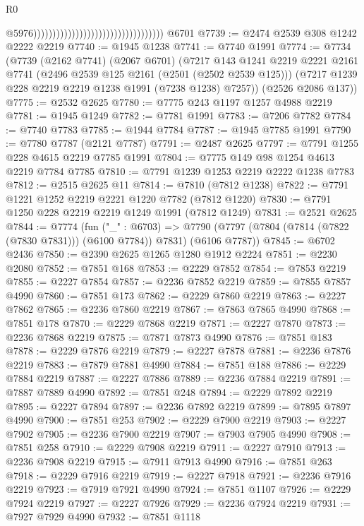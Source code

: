 \begin{lexlean}{R0}
\begin{coremodule}
                                                                        @5976))))))))))))))))))))))))))))))))))
    @6701
@7739 := @2474 @2539 @308 @1242 @2222 @2219
@7740 := @1945 @1238
@7741 := @7740 @1991
@7774 := @7734
    (@7739
      (@2162 @7741)
      (@2067 @6701)
      (@7217
        @143
        @1241
        @2219
        @2221
        @2161
        @7741
        (@2496 @2539 @125 @2161 (@2501 (@2502 @2539 @125)))
        (@7217 @1239 @228 @2219 @2219 @1238 @1991 (@7238 @1238) @7257))
      (@2526 @2086 @137))
@7775 := @2532 @2625
@7780 := @7775 @243 @1197 @1257 @4988 @2219
@7781 := @1945 @1249
@7782 := @7781 @1991
@7783 := @7206 @7782
@7784 := @7740 @7783
@7785 := @1944 @7784
@7787 := @1945 @7785 @1991
@7790 := @7780 @7787 (@2121 @7787)
@7791 := @2487 @2625
@7797 := @7791 @1255 @228 @4615 @2219 @7785 @1991
@7804 := @7775 @149 @98 @1254 @4613 @2219 @7784 @7785
@7810 := @7791 @1239 @1253 @2219 @2222 @1238 @7783
@7812 := @2515 @2625 @11
@7814 := @7810 (@7812 @1238)
@7822 := @7791 @1221 @1252 @2219 @2221 @1220 @7782 (@7812 @1220)
@7830 := @7791 @1250 @228 @2219 @2219 @1249 @1991 (@7812 @1249)
@7831 := @2521 @2625
@7844 := @7774
    (fun ("_" : @6703) =>
    @7790 (@7797 (@7804 (@7814 (@7822 (@7830 @7831))) (@6100 @7784)) @7831) (@6106 @7787))
@7845 := @6702 @2436
@7850 := @2390 @2625 @1265 @1280 @1912 @2224
@7851 := @2230 @2080
@7852 := @7851 @168
@7853 := @2229 @7852
@7854 := @7853 @2219
@7855 := @2227 @7854
@7857 := @2236 @7852 @2219
@7859 := @7855 @7857 @4990
@7860 := @7851 @173
@7862 := @2229 @7860 @2219
@7863 := @2227 @7862
@7865 := @2236 @7860 @2219
@7867 := @7863 @7865 @4990
@7868 := @7851 @178
@7870 := @2229 @7868 @2219
@7871 := @2227 @7870
@7873 := @2236 @7868 @2219
@7875 := @7871 @7873 @4990
@7876 := @7851 @183
@7878 := @2229 @7876 @2219
@7879 := @2227 @7878
@7881 := @2236 @7876 @2219
@7883 := @7879 @7881 @4990
@7884 := @7851 @188
@7886 := @2229 @7884 @2219
@7887 := @2227 @7886
@7889 := @2236 @7884 @2219
@7891 := @7887 @7889 @4990
@7892 := @7851 @248
@7894 := @2229 @7892 @2219
@7895 := @2227 @7894
@7897 := @2236 @7892 @2219
@7899 := @7895 @7897 @4990
@7900 := @7851 @253
@7902 := @2229 @7900 @2219
@7903 := @2227 @7902
@7905 := @2236 @7900 @2219
@7907 := @7903 @7905 @4990
@7908 := @7851 @258
@7910 := @2229 @7908 @2219
@7911 := @2227 @7910
@7913 := @2236 @7908 @2219
@7915 := @7911 @7913 @4990
@7916 := @7851 @263
@7918 := @2229 @7916 @2219
@7919 := @2227 @7918
@7921 := @2236 @7916 @2219
@7923 := @7919 @7921 @4990
@7924 := @7851 @1107
@7926 := @2229 @7924 @2219
@7927 := @2227 @7926
@7929 := @2236 @7924 @2219
@7931 := @7927 @7929 @4990
@7932 := @7851 @1118

\end{coremodule}
\end{lexlean}
